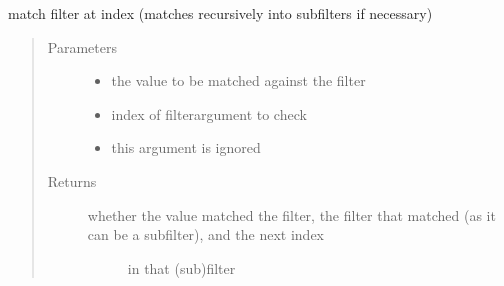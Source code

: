 \documentclass[a4paper,10pt,english]{sphinxmanual}
\begin{document}
\begin{fulllineitems}
\begin{fulllineitems}
\end{fulllineitems}


\begin{fulllineitems}
\label{\detokenize{fagus.filters:fagus.filters.KFil.match}}
\pysigstartsignatures
{}
\pysigstopsignatures
\sphinxAtStartPar
match filter at index (matches recursively into subfilters if necessary)
\begin{quote}\begin{description}
\item[{Parameters}] \leavevmode\begin{itemize}
\item {}
\sphinxAtStartPar
{} \textendash{} the value to be matched against the filter

\item {}
\sphinxAtStartPar
{} \textendash{} index of filter\sphinxhyphen{}argument to check

\item {}
\sphinxAtStartPar
\sphinxstyleliteralstrong{\sphinxupquote{\_}} \textendash{} this argument is ignored

\end{itemize}

\item[{Returns}] \leavevmode
\sphinxAtStartPar
\begin{description}
\item[{whether the value matched the filter, the filter that matched (as it can be a subfilter), and the next index}] \leavevmode
\sphinxAtStartPar
in that (sub)filter

\end{description}


\end{description}\end{quote}


\end{fulllineitems}
\end{fulllineitems}
\end{document}
